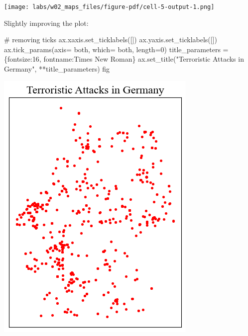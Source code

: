 \documentclass[
  letterpaper,
  DIV=11,
  numbers=noendperiod]{scrreprt}
\newenvironment{Shaded}{\begin{snugshade}}{\end{snugshade}}
\newcommand{\CommentTok}[1]{\textcolor[rgb]{0.37,0.37,0.37}{#1}}
\newcommand{\DecValTok}[1]{\textcolor[rgb]{0.68,0.00,0.00}{#1}}
\newcommand{\NormalTok}[1]{\textcolor[rgb]{0.00,0.23,0.31}{#1}}
\newcommand{\OperatorTok}[1]{\textcolor[rgb]{0.37,0.37,0.37}{#1}}
\newcommand{\StringTok}[1]{\textcolor[rgb]{0.13,0.47,0.30}{#1}}
\begin{document}
\texttt{[image: labs/w02\_maps\_files/figure-pdf/cell-5-output-1.png]}

Slightly improving the plot:

\begin{Shaded}
\begin{Highlighting}[]
\CommentTok{\# removing ticks}
\NormalTok{ax.xaxis.set\_ticklabels([])}
\NormalTok{ax.yaxis.set\_ticklabels([])}
\NormalTok{ax.tick\_params(axis}\OperatorTok{=} \StringTok{\textquotesingle{}both\textquotesingle{}}\NormalTok{, which}\OperatorTok{=} \StringTok{\textquotesingle{}both\textquotesingle{}}\NormalTok{, length}\OperatorTok{=}\DecValTok{0}\NormalTok{)}
\NormalTok{title\_parameters }\OperatorTok{=}\NormalTok{ \{}\StringTok{\textquotesingle{}fontsize\textquotesingle{}}\NormalTok{:}\StringTok{\textquotesingle{}16\textquotesingle{}}\NormalTok{, }\StringTok{\textquotesingle{}fontname\textquotesingle{}}\NormalTok{:}\StringTok{\textquotesingle{}Times New Roman\textquotesingle{}}\NormalTok{\}}
\NormalTok{ax.set\_title(}\StringTok{"Terroristic Attacks in Germany"}\NormalTok{, }\OperatorTok{**}\NormalTok{title\_parameters)}
\NormalTok{fig}
\end{Highlighting}
\end{Shaded}

\includegraphics{labs/w02_maps_files/figure-pdf/cell-6-output-1.png}
\end{document}
